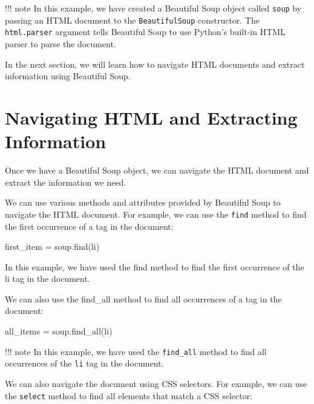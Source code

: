 \documentclass[
  paper=a4,
  ,captions=tableheading
]{scrartcl}
\newenvironment{Shaded}{}{}
\newcommand{\NormalTok}[1]{#1}
\newcommand{\OperatorTok}[1]{\textcolor[rgb]{0.40,0.40,0.40}{#1}}
\newcommand{\StringTok}[1]{\textcolor[rgb]{0.25,0.44,0.63}{#1}}
\begin{document}
!!! note In this example, we have created a Beautiful Soup object called
\texttt{soup} by passing an HTML document to the \texttt{BeautifulSoup}
constructor. The \texttt{html.parser} argument tells Beautiful Soup to
use Python's built-in HTML parser to parse the document.

In the next section, we will learn how to navigate HTML documents and
extract information using Beautiful Soup.

\hypertarget{navigating-html-and-extracting-information}{%
\section{Navigating HTML and Extracting
Information}\label{navigating-html-and-extracting-information}}

Once we have a Beautiful Soup object, we can navigate the HTML document
and extract the information we need.

We can use various methods and attributes provided by Beautiful Soup to
navigate the HTML document. For example, we can use the \texttt{find}
method to find the first occurrence of a tag in the document:

\begin{Shaded}
\begin{Highlighting}[]
\NormalTok{first\_item }\OperatorTok{=}\NormalTok{ soup.find(}\StringTok{\textquotesingle{}li\textquotesingle{}}\NormalTok{)}
\end{Highlighting}
\end{Shaded}

In this example, we have used the find method to find the first
occurrence of the li tag in the document.

We can also use the find\_all method to find all occurrences of a tag in
the document:

\begin{Shaded}
\begin{Highlighting}[]
\NormalTok{all\_items }\OperatorTok{=}\NormalTok{ soup.find\_all(}\StringTok{\textquotesingle{}li\textquotesingle{}}\NormalTok{)}
\end{Highlighting}
\end{Shaded}

!!! note In this example, we have used the \texttt{find\_all} method to
find all occurrences of the \texttt{li} tag in the document.

We can also navigate the document using CSS selectors. For example, we
can use the \texttt{select} method to find all elements that match a CSS
selector:
\end{document}
